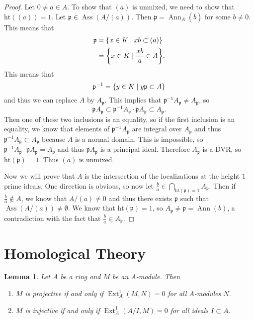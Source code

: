 \documentclass[leqno, openany]{memoir}
\newtheorem{lem}[thm]{Lemma}
\theoremstyle{definition}
\theoremstyle{remark}
\theoremstyle{plain}
\theoremstyle{definition}
\theoremstyle{remark}
\newcommand{\mf}[1]{\mathfrak{#1}}
\newcommand{\mr}[1]{\mathrm{#1}}
\newcommand{\ol}[1]{\overline{#1}}
\DeclareMathOperator{\Ext}{Ext}
\DeclareMathOperator{\Ann}{Ann}
\DeclareMathOperator{\Ass}{Ass}
\begin{document}
\begin{proof} Let $0 \neq a \in A$. To show that $(a)$ is unmixed, we need to
    show that $\mr{ht}((a)) = 1$. Let $\mf{p} \in \Ass(A/(a))$. Then $\mf{p} =
    \Ann_A(\ol{b})$ for some $b \neq 0$. This means that \begin{align*} \mf{p}
    &= \qty{x \in K \mid xb \subset (a)} \\ &= \qty{x \in K \mid \frac{xb}{a}
    \in A}.  \end{align*} This means that \[ \mf{p}^{-1} = \qty{y \in K \mid y
    \mf{p} \subset A} \] and thus we can replace $A$ by $A_{\mf{p}}$. This
    implies that $\mf{p}^{-1} A_{\mf{p}} \neq A_{\mf{p}}$, so \[ \mf{p}
    A_{\mf{p}} \subset \mf{p}^{-1} A_{\mf{p}} \cdot \mf{p} A_{\mf{p}} \subset
A_{\mf{p}}. \] Then one of these two inclusions is an equality, so if the first
inclusion is an equality, we know that elements of $\mf{p}^{-1}A_{\mf{p}}$ are
integral over $A_{\mf{p}}$ and thus $\mf{p}^{-1}A_{\mf{p}} \subset A_{\mf{p}}$
because $A$ is a normal domain. This is impossible, so $\mf{p}^{-1}A_{\mf{p}}
\cdot \mf{p}A_{\mf{p}} = A_{\mf{p}}$ and thus $\mf{p}A_{\mf{p}}$ is a principal
ideal. Therefore $A_{\mf{p}}$ is a DVR, so $\mr{ht}(\mf{p}) = 1$. Thus $(a)$ is
unmixed.

    Now we will prove that $A$ is the intersection of the localizations at the
height $1$ prime ideals. One direction is obvious, so now let $\frac{b}{a} \in
\bigcap_{\mr{ht}(\mf{p})=1} A_{\mf{p}}$. Then if $\frac{b}{a} \notin A$, we
know that $A/(a) \neq 0$ and thus there exists $\mf{p}$ such that $\Ass(A/(a))
\neq \emptyset$. We know that $\mr{ht}(\mf{p}) = 1$, so $A_{\mf{p}} \neq \mf{p}
= \Ann(b)$, a contradiction with the fact that $\frac{b}{a} \in A_{\mf{p}}$.
\end{proof}

\section{Homological Theory}%

\begin{lem} Let $A$ be a ring and $M$ be an $A$-module. Then \begin{enumerate}
    \item $M$ is projective if and only if $\Ext_A^1(M,N) = 0$ for all
        $A$-modules $N$.  \item $M$ is injective if and only if $\Ext_A^1(A/I,
        M) = 0$ for all ideals $I \subset A$.  \end{enumerate} \end{lem}
\end{document}
